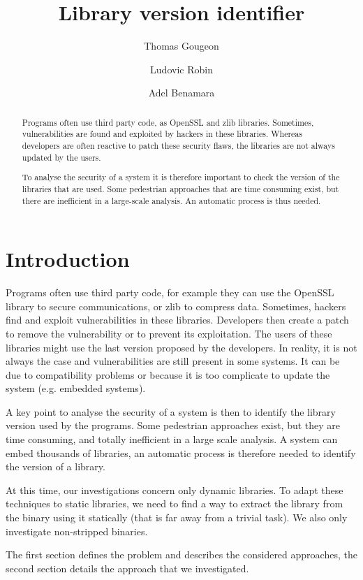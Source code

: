 \documentclass{article}
\title{Library version identifier}
\author{Thomas Gougeon \and Ludovic Robin \and Adel Benamara}
\begin{document}
	\maketitle
	
	\begin{abstract}
		Programs often use third party code, as OpenSSL and zlib libraries. Sometimes, vulnerabilities are found and exploited by hackers in these libraries. Whereas developers are often reactive to patch these security flaws, the libraries are not always updated by the users. 
		
	To analyse the security of a system it is therefore important to check the version of the libraries that are used. Some pedestrian approaches that are time consuming exist, but there are inefficient in a large-scale analysis. An automatic process is thus needed.
	
	\end{abstract}

\section{Introduction}

    Programs often use third party code, for example they can use the OpenSSL library to secure communications, or zlib to compress data. Sometimes, hackers find and exploit vulnerabilities in these libraries. Developers then create a patch to remove the vulnerability or to prevent its exploitation. The users of these libraries might use the last version proposed by the developers. In reality, it is not always the case and vulnerabilities are still present in some systems. It can be due to compatibility problems or because it is too complicate to update the system (e.g. embedded systems).
    
    A key point to analyse the security of a system is then to identify the library version used by the programs. Some pedestrian approaches exist, but they are time consuming, and totally inefficient in a large scale analysis. A system can embed thousands of libraries, an automatic process is therefore needed to identify the version of a library.
    
    At this time, our investigations concern only dynamic libraries. To adapt these techniques to static libraries, we need to find a way to extract the library from the binary using it statically (that is far away from a trivial task). We also only investigate non-stripped binaries.
    
    The first section defines the problem and describes the considered approaches, the second section details the approach that we investigated.
    
\end{document}
